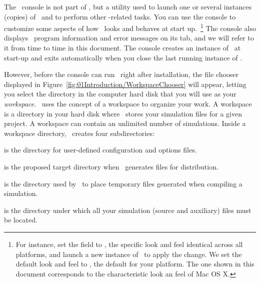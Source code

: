 The \ejs\ console is not part of \ejs, but a utility used to launch one or several instances (copies) of \ejs\ and to perform other \ejs-related tasks. You can use the console to customize some aspects of how \ejs\ looks and behaves at start up.~\footnote{For instance, set the  field to , the specific look and feel identical across all platforms, and launch a new instance of \ejs\ to apply the change. We set the default look and feel to , the default for your platform. The one shown in this document corresponds to the characteristic  look an feel of Mac OS X.} The console also displays \ejs\ program information and error messages on its  tab, and we will refer to it from time to time in this document. The console creates an instance of \ejs\ at start-up and exits automatically when you close the last running instance of \ejs. 

However, before the console can run \ejs\ right after installation, the file chooser displayed in Figure~\ref{fig:01Introduction/WorkspaceChooser} will appear, letting you select the directory in the computer hard disk that you will use as your \emph{workspace}.
\ejs\ uses the concept of a workspace to organize your work. A workspace is a directory in your hard disk where \ejs\ stores your simulation files for a given project. A workspace can contain an unlimited number of simulations. Inside a workspace directory, \ejs\ creates four subdirectories:
\begin{bulletlist}
  \item {} is the directory for user-defined configuration and options files.
  \item {} is the proposed target directory when \ejs\ generates files for distribution.
  \item {} is the directory used by \ejs\ to place temporary files generated when compiling a simulation.
  \item {} is the directory under which all your simulation (source and auxiliary) files must be located.
\end{bulletlist}

